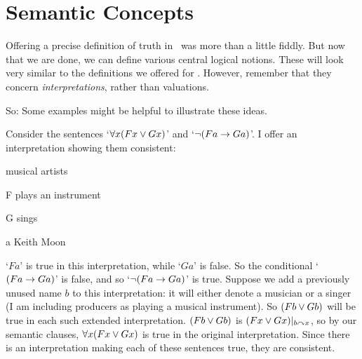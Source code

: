 \chapter{Semantic Concepts}\label{FOL.semantics}
Offering a precise definition of truth in \FOL\ was more than a little fiddly. But now that we are done, we can define various central logical notions. These will look very similar to the definitions we offered for \TFL. However, remember that they concern \emph{interpretations}, rather than valuations. 

So:
Some examples might be helpful to illustrate these ideas. 

 Consider the sentences ‘$\forall x(Fx \vee Gx)$’ and ‘$\neg(Fa \rightarrow Ga)$’. I offer an interpretation showing them consistent: \begin{ekey}
	\item[\text{Domain}] musical artists
	\item[F]  plays an instrument
	\item[G]  sings
	\item[a] Keith Moon
\end{ekey} ‘$Fa$’ is true in this interpretation, while ‘$Ga$’ is false. So the conditional `$(Fa \rightarrow Ga)$' is false, and so `$\neg(Fa \rightarrow Ga)$' is true. Suppose we add a previously unused name $b$ to this interpretation: it will either denote a musician or a singer (I am including producers as playing a musical instrument). So $(Fb \vee Gb)$ will be true in each such extended interpretation. $(Fb \vee Gb)$ is $(Fx \vee Gx)\vert_{b\curvearrowright x}$, so by our semantic clauses, $\forall x (Fx \vee Gx)$ is true in the original interpretation. Since there is an interpretation making each of these sentences true, they are consistent. 


